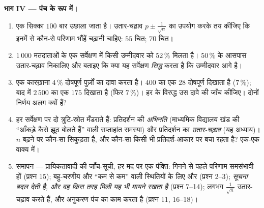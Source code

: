 \begin{problem}
\medskip
\noindent\textbf{भाग IV ---  पंच के रूप में।}
\begin{enumerate}[resume]
  \item एक सिक्का $100$ बार उछाला जाता है। उतार-चढ़ाव  $p \pm \frac{1}{\sqrt n}$ का
        उपयोग करके तय कीजिए कि इनमें से कौन-से परिणाम भौंहें चढ़ानी चाहिए:
        $55$ चित; $70$ चित।
  \item $1\,000$ मतदाताओं के एक सर्वेक्षण में किसी उम्मीदवार को $52\,\%$ मिलता
        है। $50\,\%$ के आसपास उतार-चढ़ाव  निकालिए और बताइए कि क्या यह
        सर्वेक्षण \emph{सिद्ध} करता है कि उम्मीदवार आगे है।
  \item एक कारख़ाना $4\,\%$ दोषपूर्ण पुर्ज़ों का दावा करता है। $400$ का एक
         $28$ दोषपूर्ण दिखाता है ($7\,\%$); बाद में $2\,500$ का एक
         $175$ दिखाता है (फिर $7\,\%$)। हर  के विरुद्ध उस
        दावे की जाँच कीजिए। दोनों निर्णय अलग क्यों हैं?
  \item हर सर्वेक्षण पर दो त्रुटि-स्रोत मँडराते हैं: प्रतिदर्शन की
        \emph{अभिनति} (माध्यमिक विद्यालय खंड की ``आँकड़े कैसे झूठ बोलते
        हैं'' वाली सप्ताहांत समस्या) और प्रतिदर्शन का \emph{उतार-चढ़ाव}
        (यह अध्याय)। $n$ बढ़ने पर कौन-सा सिकुड़ता है, और कौन-सा किसी भी
        प्रतिदर्श-आकार पर बचा रहता है? एक-एक वाक्य में।
  \item समापन --- प्रायिकतावादी की जाँच-सूची, हर मद पर एक पंक्ति: गिनने
        से पहले परिणाम समसंभावी हों (प्रश्न 15); बहु-चरणीय और ``कम से कम''
        वाली स्थितियों के लिए  और  (प्रश्न 2--3); \emph{सूचना
         बदल देती है, और वह किस तरह मिली यह भी मायने रखता है}
        (प्रश्न 7--14);  लगभग $\frac{1}{\sqrt n}$ उतार-चढ़ाव करते हैं, और
        अनुकरण पंच का काम करता है (प्रश्न 11, 16--18)।
\end{enumerate}
\end{problem}
